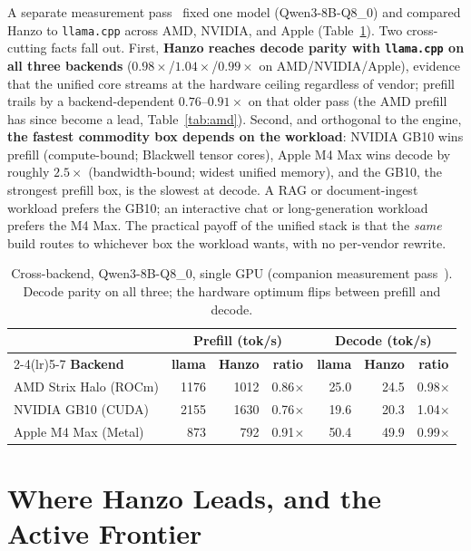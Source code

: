 \documentclass[11pt]{article}
\begin{document}
A separate measurement pass~\cite{hanzorocm} fixed one model (Qwen3-8B-Q8\_0) and compared Hanzo to
\texttt{llama.cpp} across AMD, NVIDIA, and Apple (Table~\ref{tab:cross}). Two cross-cutting facts
fall out. First, \textbf{Hanzo reaches decode parity with \texttt{llama.cpp} on all three backends}
($0.98\times$/$1.04\times$/$0.99\times$ on AMD/NVIDIA/Apple), evidence that the unified core streams
at the hardware ceiling regardless of vendor; prefill trails by a backend-dependent
$0.76$--$0.91\times$ on that older pass (the AMD prefill has since become a lead, Table~\ref{tab:amd}).
Second, and orthogonal to the engine, \textbf{the fastest commodity box depends on the workload}:
NVIDIA GB10 wins prefill (compute-bound; Blackwell tensor cores), Apple M4 Max wins decode by roughly
$2.5\times$ (bandwidth-bound; widest unified memory), and the GB10, the strongest prefill box, is the
slowest at decode. A RAG or document-ingest workload prefers the GB10; an interactive chat or
long-generation workload prefers the M4 Max. The practical payoff of the unified stack is that the
\emph{same} build routes to whichever box the workload wants, with no per-vendor rewrite.

\begin{table}[t]
\centering
\caption{Cross-backend, Qwen3-8B-Q8\_0, single GPU (companion measurement pass~\cite{hanzorocm}).
Decode parity on all three; the hardware optimum flips between prefill and decode.}
\label{tab:cross}
\begin{tabular}{l rr c rr c}
\toprule
& \multicolumn{3}{c}{\textbf{Prefill (tok/s)}} & \multicolumn{3}{c}{\textbf{Decode (tok/s)}} \\
\cmidrule(lr){2-4}\cmidrule(lr){5-7}
\textbf{Backend} & \textbf{llama} & \textbf{Hanzo} & \textbf{ratio} & \textbf{llama} & \textbf{Hanzo} & \textbf{ratio} \\
\midrule
AMD Strix Halo (ROCm)  & 1176 & 1012 & 0.86$\times$ & 25.0 & 24.5 & 0.98$\times$ \\
NVIDIA GB10 (CUDA)     & 2155 & 1630 & 0.76$\times$ & 19.6 & 20.3 & 1.04$\times$ \\
Apple M4 Max (Metal)   &  873 &  792 & 0.91$\times$ & 50.4 & 49.9 & 0.99$\times$ \\
\bottomrule
\end{tabular}
\end{table}

\section{Where Hanzo Leads, and the Active Frontier}
\label{sec:frontier}
\end{document}
